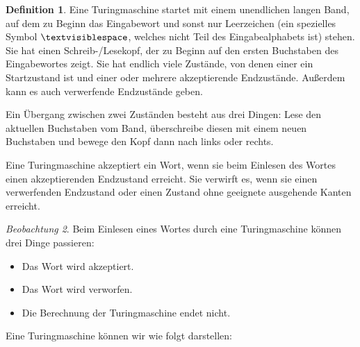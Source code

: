 \documentclass[a4paper,ngerman,12pt]{scrartcl}
\theoremstyle{definition}
\newtheorem{defn}{Definition}[]
\theoremstyle{plain}
\theoremstyle{remark}
\newtheorem{beob}[defn]{Beobachtung}
\begin{document}
\begin{defn}
	Eine Turingmaschine startet mit einem unendlichen langen Band, auf dem zu Beginn das Eingabewort und sonst nur Leerzeichen (ein spezielles Symbol $\textvisiblespace$, welches nicht Teil des Eingabealphabets ist) stehen. Sie hat einen Schreib-/Lesekopf, der zu Beginn auf den ersten Buchstaben des Eingabewortes zeigt. Sie hat endlich viele Zustände, von denen einer ein Startzustand ist und einer oder mehrere akzeptierende Endzustände. Außerdem kann es auch verwerfende Endzustände geben. 
	
	Ein Übergang zwischen zwei Zuständen besteht aus drei Dingen: Lese den aktuellen Buchstaben vom Band, überschreibe diesen mit einem neuen Buchstaben und bewege den Kopf dann nach links oder rechts.
	
	Eine Turingmaschine akzeptiert ein Wort, wenn sie beim Einlesen des Wortes einen akzeptierenden Endzustand erreicht. Sie verwirft es, wenn sie einen verwerfenden Endzustand oder einen Zustand ohne geeignete ausgehende Kanten erreicht.
\end{defn}

\begin{beob}
	Beim Einlesen eines Wortes durch eine Turingmaschine können drei Dinge passieren:
	\begin{itemize}
		\item Das Wort wird akzeptiert.
		\item Das Wort wird verworfen.
		\item Die Berechnung der Turingmaschine endet nicht.
	\end{itemize}
\end{beob}

Eine Turingmaschine können wir wie folgt darstellen:
\begin{center}
\end{center}
\end{document}
